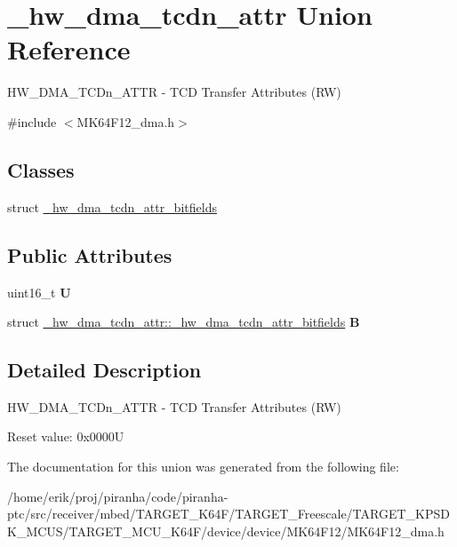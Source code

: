 \hypertarget{union__hw__dma__tcdn__attr}{}\section{\+\_\+hw\+\_\+dma\+\_\+tcdn\+\_\+attr Union Reference}
\label{union__hw__dma__tcdn__attr}


H\+W\+\_\+\+D\+M\+A\+\_\+\+T\+C\+Dn\+\_\+\+A\+T\+TR -\/ T\+CD Transfer Attributes (RW)  




{\ttfamily \#include $<$M\+K64\+F12\+\_\+dma.\+h$>$}

\subsection*{Classes}
\begin{DoxyCompactItemize}
\item 
struct \hyperlink{struct__hw__dma__tcdn__attr_1_1__hw__dma__tcdn__attr__bitfields}{\+\_\+hw\+\_\+dma\+\_\+tcdn\+\_\+attr\+\_\+bitfields}
\end{DoxyCompactItemize}
\subsection*{Public Attributes}
\begin{DoxyCompactItemize}
\item 
uint16\+\_\+t {\bfseries U}\hypertarget{union__hw__dma__tcdn__attr_a84db42aca6b76655dd1c9a167cf8c8f2}{}\label{union__hw__dma__tcdn__attr_a84db42aca6b76655dd1c9a167cf8c8f2}

\item 
struct \hyperlink{struct__hw__dma__tcdn__attr_1_1__hw__dma__tcdn__attr__bitfields}{\+\_\+hw\+\_\+dma\+\_\+tcdn\+\_\+attr\+::\+\_\+hw\+\_\+dma\+\_\+tcdn\+\_\+attr\+\_\+bitfields} {\bfseries B}\hypertarget{union__hw__dma__tcdn__attr_afb23759135e3fef7edd14488378f4320}{}\label{union__hw__dma__tcdn__attr_afb23759135e3fef7edd14488378f4320}

\end{DoxyCompactItemize}


\subsection{Detailed Description}
H\+W\+\_\+\+D\+M\+A\+\_\+\+T\+C\+Dn\+\_\+\+A\+T\+TR -\/ T\+CD Transfer Attributes (RW) 

Reset value\+: 0x0000U 

The documentation for this union was generated from the following file\+:\begin{DoxyCompactItemize}
\item 
/home/erik/proj/piranha/code/piranha-\/ptc/src/receiver/mbed/\+T\+A\+R\+G\+E\+T\+\_\+\+K64\+F/\+T\+A\+R\+G\+E\+T\+\_\+\+Freescale/\+T\+A\+R\+G\+E\+T\+\_\+\+K\+P\+S\+D\+K\+\_\+\+M\+C\+U\+S/\+T\+A\+R\+G\+E\+T\+\_\+\+M\+C\+U\+\_\+\+K64\+F/device/device/\+M\+K64\+F12/M\+K64\+F12\+\_\+dma.\+h\end{DoxyCompactItemize}
